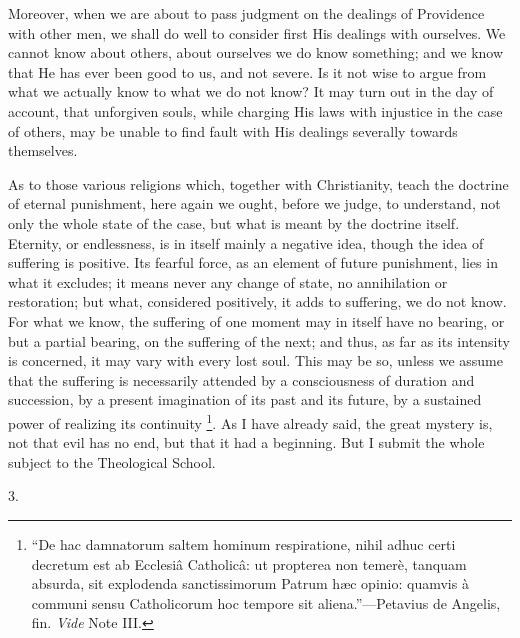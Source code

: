 Moreover, when we are about to pass judgment on the dealings of
Providence with other men, we shall do well to consider first His
dealings with ourselves. We cannot know about others, about ourselves
we do know something; and we know that He has ever been good to us,
and not severe. Is it not wise to argue from what we actually know to
what we do not know? It may turn out in the day of account, that
unforgiven souls, while charging His laws with injustice in the case
of others, may be unable to find fault with His dealings
severally towards themselves.

As to those various religions which, together with Christianity,
teach the doctrine of eternal punishment, here again we ought, before
we judge, to understand, not only the whole state of the case, but
what is meant by the doctrine itself. Eternity, or endlessness, is in
itself mainly a negative idea, though the idea of suffering is
positive. Its fearful force, as an element of future punishment, lies
in what it excludes; it means never any change of state, no
annihilation or restoration; but what, considered positively, it adds
to suffering, we do not know. For what we know, the suffering of one
moment may in itself have no bearing, or but a partial bearing, on the
suffering of the next; and thus, as far as its intensity is concerned,
it may vary with every lost soul. This may be so, unless we assume
that the suffering is necessarily attended by a consciousness of
duration and succession, by a present imagination of its past and its
future, by a sustained power of realizing its continuity \footnote{``De hac
damnatorum saltem hominum respiratione, nihil adhuc certi decretum est
ab Ecclesiâ Catholicâ: ut propterea non temerè, tanquam absurda,
sit explodenda sanctissimorum Patrum hæc opinio: quamvis à communi
sensu Catholicorum hoc tempore sit aliena.''—Petavius de Angelis,
fin. \emph{Vide} Note III.}. As I have already said, the great mystery is, not that evil
has no end, but that it had a beginning. But I submit the whole
subject to the Theological School.

3.

